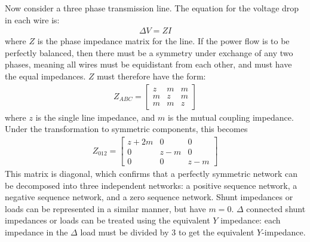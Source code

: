 \documentclass[11pt]{article}
\begin{document}
Now consider a three phase transmission line. The equation for the voltage drop in each wire is:
\begin{align}
	\Delta V = ZI
\end{align}
where $Z$ is the phase impedance matrix for the line. If the power flow is to be perfectly balanced, then there must be a symmetry under exchange of any two phases, meaning all wires must be equidistant from each other, and must have the equal impedances. $Z$ must therefore have the form:
\begin{align}
	Z_{ABC} = \left[
			\begin{array}{lll}
				z & m & m \\
				m & z & m \\
				m & m & z
			\end{array}
		\right]
		\label{EQ_ZABC}
\end{align}
where $z$ is the single line impedance, and $m$ is the mutual coupling impedance. Under the transformation to symmetric components, this becomes
\begin{align}
	Z_{012} = \left[
			\begin{array}{lll}
				z+2m & 0 & 0 \\
				0 & z-m & 0 \\
				0 & 0 & z-m
			\end{array}
		\right]
		\label{EQ_Z012}
\end{align}
This matrix is diagonal, which confirms that a perfectly symmetric network can be decomposed into three independent networks: a positive sequence network, a negative sequence network, and a zero sequence network. Shunt impedances or loads can be represented in a similar manner, but have $m = 0$. $\Delta$ connected shunt impedances or loads can be treated using the equivalent $Y$ impedance: each impedance in the $\Delta$ load must be divided by 3 to get the equivalent $Y$-impedance.
\end{document}
